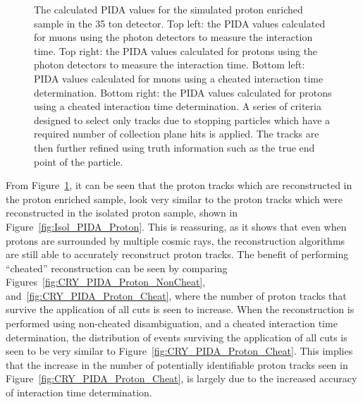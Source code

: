 \begin{figure}
  \caption[The calculated PIDA values for the simulated proton enriched sample in the 35 ton detector]
          {The calculated PIDA values for the simulated proton enriched sample in the 35 ton detector. Top left: the PIDA values calculated for muons using the photon detectors to measure the interaction time. Top right: the PIDA values calculated for protons using the photon detectors to measure the interaction time. Bottom left: PIDA values calculated for muons using a cheated interaction time determination. Bottom right: the PIDA values calculated for protons using a cheated interaction time determination. A series of criteria designed to select only tracks due to stopping particles which have a required number of collection plane hits is applied. The tracks are then further refined using truth information such as the true end point of the particle.}
  \label{fig:CRY_PIDA}
\end{figure}

From Figure~\ref{fig:CRY_PIDA}, it can be seen that the proton tracks which are reconstructed in the proton enriched sample, look very similar to the proton tracks which were reconstructed in the isolated proton sample, shown in Figure~\ref{fig:Isol_PIDA_Proton}. This is reassuring, as it shows that even when protons are surrounded by multiple cosmic rays, the reconstruction algorithms are still able to accurately reconstruct proton tracks. The benefit of performing ``cheated'' reconstruction can be seen by comparing Figures~\ref{fig:CRY_PIDA_Proton_NonCheat}, and~\ref{fig:CRY_PIDA_Proton_Cheat}, where the number of proton tracks that survive the application of all cuts is seen to increase. When the reconstruction is performed using non-cheated disambiguation, and a cheated interaction time determination, the distribution of events surviving the application of all cuts is seen to be very similar to Figure~\ref{fig:CRY_PIDA_Proton_Cheat}. This implies that the increase in the number of potentially identifiable proton tracks seen in Figure~\ref{fig:CRY_PIDA_Proton_Cheat}, is largely due to the increased accuracy of interaction time determination. \\

